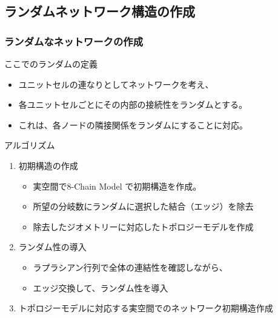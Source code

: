 \documentclass[11pt, dvipdfmx]{beamer}
\begin{document}


\subsection{ランダムネットワーク構造の作成}
\begin{frame}
\frametitle{ランダムなネットワークの作成}
\small
\vspace{-2mm}
\begin{block}{ここでのランダムの定義}
\begin{itemize}
\item
ユニットセルの連なりとしてネットワークを考え、
\item
各ユニットセルごとにその内部の接続性をランダムとする。
\item
これは、\alert{各ノードの隣接関係をランダム}にすることに対応。
\end{itemize}
\end{block}
\vspace{-1mm}
\begin{exampleblock}{アルゴリズム}
\begin{enumerate}
\item
初期構造の作成
\vspace{-1mm}
	\begin{itemize}
	\item
	\alert{実空間}で8-Chain Model で初期構造を作成。
	\item
	所望の分岐数に\alert{ランダム}に選択した\alert{結合（エッジ）を除去}
	\item
	除去したジオメトリーに対応した\alert{トポロジーモデル}を作成
	\end{itemize}
\item
ランダム性の導入
\vspace{-2mm}
	\begin{itemize}
 	\item 
 	ラプラシアン行列で\alert{全体の連結性を確認}しながら、
 	\item
 	エッジ交換して、ランダム性を導入
	\end{itemize}	
\item
トポロジーモデルに対応する実空間でのネットワーク初期構造作成
\end{enumerate}
\end{exampleblock}
\end{frame}
\end{document}
